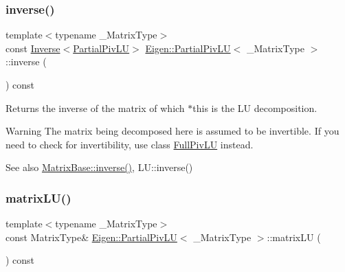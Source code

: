 \subsubsection{\texorpdfstring{inverse()}{inverse()}}
{\footnotesize\ttfamily template$<$typename \+\_\+\+Matrix\+Type$>$ \\
const \mbox{\hyperlink{class_eigen_1_1_inverse}{Inverse}}$<$\mbox{\hyperlink{class_eigen_1_1_partial_piv_l_u}{Partial\+Piv\+LU}}$>$ \mbox{\hyperlink{class_eigen_1_1_partial_piv_l_u}{Eigen\+::\+Partial\+Piv\+LU}}$<$ \+\_\+\+Matrix\+Type $>$\+::inverse (\begin{DoxyParamCaption}{ }\end{DoxyParamCaption}) const\hspace{0.3cm}{\ttfamily [inline]}}

\begin{DoxyReturn}{Returns}
the inverse of the matrix of which $\ast$this is the LU decomposition.
\end{DoxyReturn}
\begin{DoxyWarning}{Warning}
The matrix being decomposed here is assumed to be invertible. If you need to check for invertibility, use class \mbox{\hyperlink{class_eigen_1_1_full_piv_l_u}{Full\+Piv\+LU}} instead.
\end{DoxyWarning}
\begin{DoxySeeAlso}{See also}
\mbox{\hyperlink{class_eigen_1_1_matrix_base_a7712eb69e8ea3c8f7b8da1c44dbdeebf}{Matrix\+Base\+::inverse()}}, L\+U\+::inverse() 
\end{DoxySeeAlso}
\mbox{\label{class_eigen_1_1_partial_piv_l_u_abea0d7e51c5591a6db152eade0892d9c}} 
\subsubsection{\texorpdfstring{matrixLU()}{matrixLU()}}
{\footnotesize\ttfamily template$<$typename \+\_\+\+Matrix\+Type$>$ \\
const Matrix\+Type\& \mbox{\hyperlink{class_eigen_1_1_partial_piv_l_u}{Eigen\+::\+Partial\+Piv\+LU}}$<$ \+\_\+\+Matrix\+Type $>$\+::matrix\+LU (\begin{DoxyParamCaption}{ }\end{DoxyParamCaption}) const\hspace{0.3cm}{\ttfamily [inline]}}

